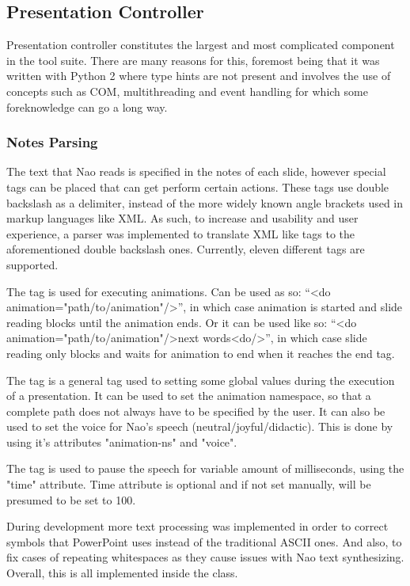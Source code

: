 \documentclass[12pt, fleqn, a4paper]{article}
\begin{document}
\subsection{Presentation Controller}
Presentation controller constitutes the largest and most complicated component in the tool suite. There are many reasons for this, foremost being that it was written with Python 2 where type hints are not present and involves the use of concepts such as COM, multithreading and event handling for which some foreknowledge can go a long way.
\subsubsection{Notes Parsing}
The text that Nao reads is specified in the notes of each slide, however special tags can be placed that can get perform certain actions. These tags use double backslash as a delimiter, instead of the more widely known angle brackets used in markup languages like XML. As such, to increase and usability and user experience, a parser was implemented to translate XML like tags to the aforementioned double backslash ones. Currently, eleven different tags are supported.\par
The  tag is used for executing animations. Can be used as so: \enquote{<do animation="path/to/animation"/>}, in which case animation is started and slide reading blocks until the animation ends. Or it can be used like so: \enquote{<do animation="path/to/animation"/>next words<do/>}, in which case slide reading only blocks and waits for animation to end when it reaches the end tag.\par
The  tag is a general tag used to setting some global values during the execution of a presentation. It can be used to set the animation namespace, so that a complete path does not always have to be specified by the user. It can also be used to set the voice for Nao's speech (neutral/joyful/didactic). This is done by using it's attributes "animation-ns" and "voice".\par
The  tag is used to pause the speech for variable amount of milliseconds, using the "time" attribute. Time attribute is optional and if not set manually, will be presumed to be set to 100.\par
During development more text processing was implemented in order to correct symbols that PowerPoint uses instead of the traditional ASCII ones. And also, to fix cases of repeating whitespaces as they cause issues with Nao text synthesizing. Overall, this is all implemented inside the  class.
\end{document}
